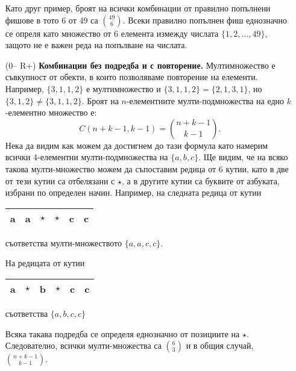 \begin{enumerate}
  Като друг пример, броят на всички комбинации от правилно попълнени фишове в тото 6 от 49 са $\binom{49}{6}$.
  Всеки правилно попълнен фиш еднозначно се опреля като множество от 6 елемента измежду числата $\{1,2,\dots,49\}$,
  защото не е важен реда на попълване на числата.
\item[(0-- R+)]
  {\bf Комбинации без подредба и с повторение.}
  Мултимножество е съвкупност от обекти, в които позволяваме повторение на елементи.
  Например, $\{3,1,1,2\}$ е мултимножество и $\{3,1,1,2\} = \{2,1,3,1\}$,
  но $\{3,1,2\} \neq \{3,1,1,2\}$.
  Броят на $n$-елементните мулти-подмножества на едно $k$-елементно множество е:
  \[C(n+k-1,k-1) = \binom{n+k-1}{k-1}.\]
  Нека да видим как можем да достигнем до тази формула като намерим всички 4-елементни мулти-подмножества
  на $\{a,b,c\}$. Ще видим, че на всяко такова мулти-множество можем да съпоставим редица от 6 кутии,
  като в две от тези кутии са отбелязани с $\star$, а в другите кутии са буквите от азбуката, избрани по определен начин.
  Например, на следната редица от кутии
  \begin{tabular}{|l|l|l|l|l|l|}
    \hline
    a & a & $\star$ & $\star$ & c & c \\
    \hline
  \end{tabular}
  съответства мулти-множеството $\{a,a,c,c\}$.

  На редицата от кутии
  \begin{tabular}{|l|l|l|l|l|l|}
    \hline
    a & $\star$ & b & $\star$ & c & c \\
    \hline
  \end{tabular}
  съответства $\{a,b,c,c\}$
  
  Всяка такава подредба се определя еднозначно от позициите на $\star$.
  Следователно, всички мулти-множества са $\binom{6}{3}$ и в общия случай,
  $\binom{n+k-1}{k-1}$.
  
\end{enumerate}

